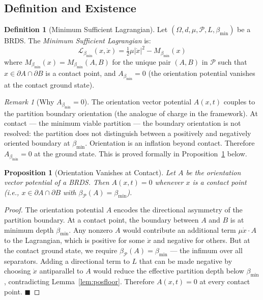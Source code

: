 \documentclass[11pt,twocolumn,a4paper]{article}
\theoremstyle{plain}
\newtheorem{proposition}[theorem]{Proposition}
\theoremstyle{definition}
\newtheorem{definition}[theorem]{Definition}
\theoremstyle{remark}
\newtheorem{remark}[theorem]{Remark}
\newcommand{\bmin}{\beta_{\min}}
\newcommand{\Lmin}{\mathcal{L}_{\bmin}}
\newcommand{\Pcal}{\mathcal{P}}
\newcommand{\half}{\tfrac{1}{2}}
\renewcommand{\qed}{\hfill$\blacksquare$}
\begin{document}
\subsection{Definition and Existence}

\begin{definition}[Minimum Sufficient Lagrangian]
\label{def:msl}
Let $(\Omega, d, \mu, \Pcal, L, \bmin)$ be a BRDS. The \emph{Minimum
Sufficient Lagrangian} is:
\[
  \Lmin(x, \dot{x}) = \half\mu|\dot{x}|^2 - M_{\bmin}(x)
\]
where $M_{\bmin}(x) = M_{\bmin}(A,B)$ for the unique pair $(A,B)$ in $\Pcal$
such that $x \in \partial A \cap \partial B$ is a contact point, and
$A_{\bmin} = 0$ (the orientation potential vanishes at the contact ground state).
\end{definition}

\begin{remark}[Why $A_{\bmin} = 0$]
\label{rem:novector}
The orientation vector potential $A(x,t)$ couples to the partition boundary
orientation (the analogue of charge in the framework). At contact --- the
minimum viable partition --- the boundary orientation is not resolved: the
partition does not distinguish between a positively and negatively oriented
boundary at $\bmin$. Orientation is an inflation beyond contact. Therefore
$A_{\bmin} = 0$ at the ground state. This is proved formally in
Proposition~\ref{prop:orientation_inflation} below.
\end{remark}

\begin{proposition}[Orientation Vanishes at Contact]
\label{prop:orientation_inflation}
Let $A$ be the orientation vector potential of a BRDS. Then $A(x,t) = 0$
whenever $x$ is a contact point (i.e., $x \in \partial A \cap \partial B$ with
$\beta_\Pcal(A) = \bmin$).
\end{proposition}

\begin{proof}
The orientation potential $A$ encodes the directional asymmetry of the partition
boundary. At a contact point, the boundary between $A$ and $B$ is at minimum
depth $\bmin$. Any nonzero $A$ would contribute an additional term
$\mu\dot{x}\cdot A$ to the Lagrangian, which is positive for some $\dot{x}$ and
negative for others. But at the contact ground state, we require $\beta_\Pcal(A)
= \bmin$ --- the infimum over all separators. Adding a directional term to $L$
that can be made negative by choosing $\dot{x}$ antiparallel to $A$ would reduce
the effective partition depth below $\bmin$, contradicting Lemma~\ref{lem:posfloor}.
Therefore $A(x,t) = 0$ at every contact point. \qed
\end{proof}
\end{document}
